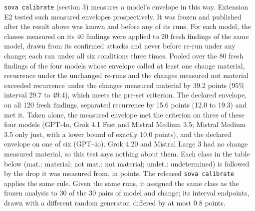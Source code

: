\documentclass[
  american,
  10pt,
  a4paper,
]{article}
\begin{document}
\texttt{sova\ calibrate} (section 3) measures a model's envelope in this
way. Extension E2 tested such measured envelopes prospectively. It was
frozen and published after the result above was known and before any of
its runs. For each model, the classes measured on its 40 findings were
applied to 20 fresh findings of the same model, drawn from its confirmed
attacks and never before re-run under any change; each ran under all six
conditions three times. Pooled over the 80 fresh findings of the four
models whose envelope called at least one change material, recurrence
under the unchanged re-runs and the changes measured not material
exceeded recurrence under the changes measured material by 39.2 points
(95\% interval 29.7 to 49.4), which meets the pre-set criterion. The
declared envelope, on all 120 fresh findings, separated recurrence by
15.6 points (12.0 to 19.3) and met it. Taken alone, the measured
envelope met the criterion on three of these four models (GPT-4o, Grok
4.1 Fast and Mistral Medium 3.5; Mistral Medium 3.5 only just, with a
lower bound of exactly 10.0 points), and the declared envelope on one of
six (GPT-4o). Grok 4.20 and Mistral Large 3 had no change measured
material, so this test says nothing about them. Each class in the table
below (mat.: material; not mat.: not material; undet.: undetermined) is
followed by the drop it was measured from, in points. The released
\texttt{sova\ calibrate} applies the same rule. Given the same runs, it
assigned the same class as the frozen analysis to 30 of the 30 pairs of
model and change; its interval endpoints, drawn with a different random
generator, differed by at most 0.8 points.
\end{document}

